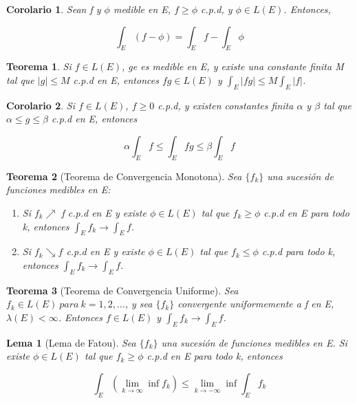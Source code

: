 \documentclass{article}
\newtheorem{theorem}{Teorema}
\newtheorem{corollary}{Corolario}
\newtheorem{lemma}{Lema}
\begin{document}
\begin{corollary}
Sean f y $\phi$ medible en E, $f \geq \phi$ c.p.d, y $\phi \in L(E)$. Entonces, 

\begin{equation*}
\int_E(f - \phi) = \int_E f - \int_E \phi
\end{equation*}
\end{corollary}

\begin{theorem}
Si $f \in L(E)$, ge es medible en E, y existe una constante finita M tal que $|g| \leq M$ c.p.d en E, entonces $fg \in L(E)$ y $\int_E|fg| \leq M \int_E |f|$.
\end{theorem}

\begin{corollary}
Si $f \in L(E)$, $f \geq 0$ c.p.d, y existen constantes finita $\alpha$ y $\beta$ tal que $\alpha \leq g \leq \beta$ c.p.d en E, entonces

\begin{equation*}
\alpha \int_E f \leq \int_E fg \leq \beta \int_E f
\end{equation*}
\end{corollary}

\begin{theorem}[Teorema de Convergencia Monotona]

Sea $\{f_k\}$ una sucesión de funciones medibles en E:

\begin{enumerate}[label=(\roman*)]
\item Si $f_k \nearrow$ f c.p.d en E y existe $\phi \in L(E)$ tal que $f_k \geq \phi$ c.p.d en E para todo k, entonces $\int_E f_k \rightarrow \int_E f$.

\item Si $f_k \searrow f$ c.p.d en E y existe $\phi \in L(E)$ tal que $f_k \leq \phi$ c.p.d para todo k, entonces $\int_E f_k \rightarrow \int_E f$.

\end{enumerate}
\end{theorem}

\begin{theorem}[Teorema de Convergencia Uniforme]
Sea $f_k \in L(E) \> para \> k=1,2,\ldots$, y sea $\{f_k\}$ convergente uniformemente a f en E, $\lambda(E) < \infty$. Entonces $f \in L(E)$ y $\int_E f_k \rightarrow \int_E f$.
\end{theorem}

\begin{lemma}[Lema de Fatou]
Sea $\{f_k\}$ una sucesión de funciones medibles en E. Si existe $\phi \in L(E)$ tal que $f_k \geq \phi$ c.p.d en E para todo k, entonces

\begin{equation*}
\int_E(\lim_{k \to \infty} \inf f_k) \leq \lim_{k \to -\infty} \inf \int_E f_k
\end{equation*}
\end{lemma}
\end{document}
